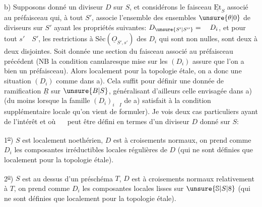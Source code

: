b) Supposons donné un diviseur $D$ sur $S$,  et considérons le faisceau  $\underline{\mathrm{Et}}_S$ associé au préfaisceau qui, à tout $S'$, associe l'ensemble des  ensembles   $\unsure{\theta|0}$ de diviseurs sur $S'$ ayant les propriétés suivantes: $D_{\unsure{S'|S''}}=\quad D_i$, et pour tout $s'\quad S'$, les restrictions  à $\text{Sêc}(\underline{O}_{S',s'})$ des $D_i$ qui sont non nulles, sont deux à deux disjointes. Soit donnée une section du
faisceau associé au préfaisceau précédent (NB la condition canularesque mise sur les $(D_i)$ assure que l'on a bien un préfaisceau). Alors localement pour la topologie étale, on a donc une situation $(D_i)$ comme dans a). Cela suffit pour définir une donnée de ramification $\underline{R}$ sur $\unsure{B|S}$, généralisant d'ailleurs celle envisagée dans a) (du moins lorsque la famille $(D_i)_{i\quad I}$ de a) satisfait à la condition supplémentaire locale qu'on vient de formuler). Je vois deux cas particuliers ayant de l'intérêt  et  où $\quad$ peut être défini en termes d'un diviseur $D$ donné sur $S$:

1\textsuperscript{\uline{o}}) $S$ est localement noethérien, $D$ est à croisements normaux, on prend comme $D_i$ les composantes irréductibles locales régulières de $D$ (qui ne sont définies que localement pour la topologie étale).

2\textsuperscript{\uline{o}}) $S$ est au dessus d'un préschéma $T$, $D$ est à croisements normaux relativement à $T$, on prend comme $D_i$ les composantes locales lisses sur $\unsure{\mathbb{S}|S|8}$ (qui ne sont définies que localement pour la topologie étale).

